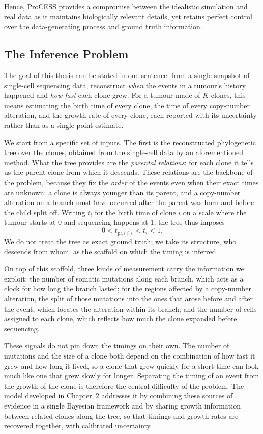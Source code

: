 Hence, ProCESS provides a compromise between the idealistic simulation and real data as it maintains biologically relevant details, yet retains perfect control over the data-generating process and ground truth information.

\subsection{The Inference Problem}

The goal of this thesis can be stated in one sentence: from a single snapshot of
single-cell sequencing data, reconstruct \emph{when} the events in a tumour's history
happened and \emph{how fast} each clone grew. For a tumour made of $K$ clones, this
means estimating the birth time of every clone, the time of every copy-number
alteration, and the growth rate of every clone, each reported with its uncertainty
rather than as a single point estimate.

We start from a specific set of inputs. The first is the reconstructed phylogenetic
tree over the clones, obtained from the single-cell data by an aforementioned method. What
the tree provides are the \emph{parental relations}: for each clone it tells us the
parent clone from which it descends. These relations are the backbone of the problem,
because they fix the \emph{order} of the events even when their exact times are
unknown: a clone is always younger than its parent, and a copy-number alteration on a
branch must have occurred after the parent was born and before the child split off.
Writing $t_i$ for the birth time of clone $i$ on a scale where the tumour starts at
$0$ and sequencing happens at $1$, the tree thus imposes
%
\begin{equation}
    0 < t_{\mathrm{pa}(i)} < t_i < 1 .
\end{equation}
%
We do not treat the tree as exact ground truth; we take its structure, who descends
from whom, as the scaffold on which the timing is inferred.

On top of this scaffold, three kinds of measurement carry the information we exploit:
the number of somatic mutations along each branch, which acts as a clock for how long
the branch lasted; for the regions affected by a copy-number alteration, the split of
those mutations into the ones that arose before and after the event, which locates the
alteration within its branch; and the number of cells assigned to each clone, which
reflects how much the clone expanded before sequencing.

These signals do not pin down the timings on their own. The number of mutations and
the size of a clone both depend on the combination of how fast it grew and how long it
lived, so a clone that grew quickly for a short time can look much like one that grew
slowly for longer. Separating the timing of an event from the growth of the clone is
therefore the central difficulty of the problem. The model developed in Chapter~2
addresses it by combining these sources of evidence in a single Bayesian framework and
by sharing growth information between related clones along the tree, so that timings
and growth rates are recovered together, with calibrated uncertainty.
